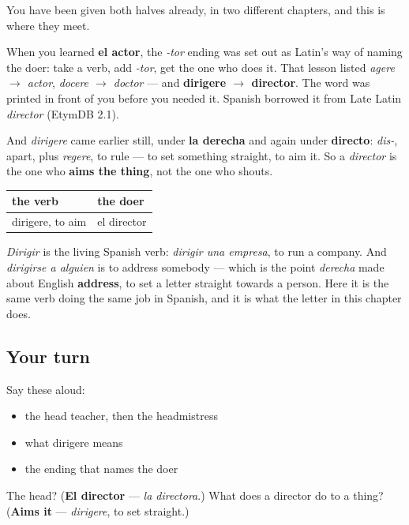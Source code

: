 \begin{cousinweb}
You have been given both halves already, in two different chapters, and this is where they meet.

When you learned \textbf{el actor}, the \emph{-tor} ending was set out as Latin's way of naming the doer: take a verb, add \emph{-tor}, get the one who does it. That lesson listed \emph{agere $\to$ actor}, \emph{docere $\to$ doctor} — and \textbf{dirigere $\to$ director}. The word was printed in front of you before you needed it. Spanish borrowed it from Late Latin \emph{director} (EtymDB 2.1).

And \emph{dirigere} came earlier still, under \textbf{la derecha} and again under \textbf{directo}: \emph{dis-}, apart, plus \emph{regere}, to rule — to set something straight, to aim it. So a \emph{director} is the one who \textbf{aims the thing}, not the one who shouts.

\noindent
\begin{tabularx}{\linewidth}{@{}>{\raggedright\arraybackslash}X>{\raggedright\arraybackslash}X@{}}
\toprule
\textbf{the verb} & \textbf{the doer} \\
\midrule
dirigere, to aim & el director \\
\bottomrule
\end{tabularx}

\emph{Dirigir} is the living Spanish verb: \emph{dirigir una empresa}, to run a company. And \emph{dirigirse a alguien} is to address somebody — which is the point \emph{derecha} made about English \textbf{address}, to set a letter straight towards a person. Here it is the same verb doing the same job in Spanish, and it is what the letter in this chapter does.
\end{cousinweb}

\subsection*{Your turn}
Say these aloud:

\begin{itemize}
\raggedright
  \item the head teacher, then the headmistress
  \item what dirigere means
  \item the ending that names the doer
\end{itemize}

\begin{tcolorbox}[breakable,colback=teal!4,colframe=teal!35!black,title={Before you move on}]
The head? (\textbf{El director} — \emph{la directora}.) What does a director do to a thing? (\textbf{Aims it} — \emph{dirigere}, to set straight.)
\end{tcolorbox}
